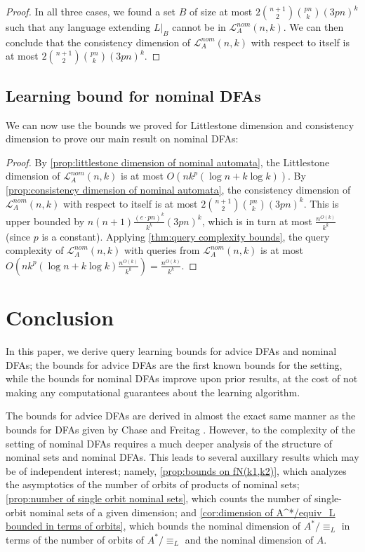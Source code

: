 \documentclass[11pt,a4paper]{amsart}
\theoremstyle{definition}
\newcommand{\mc}{\mathcal}
\begin{document}
\begin{proof}
    In all three cases, we found a set $B$ of size at most $2 \binom{n+1}{2} \binom{pn}{k} (3pn)^k$ such that any language extending $L|_B$ cannot be in $\mc L^{nom}_A(n,k)$. 
    We can then conclude that the consistency dimension of $\mc L^{nom}_A(n,k)$ with respect to itself is at most $2 \binom{n+1}{2} \binom{pn}{k} (3pn)^k$.
\end{proof}



\subsection{Learning bound for nominal DFAs}

We can now use the bounds we proved for Littlestone dimension and consistency dimension to prove our main result on nominal DFAs:


\nominalLCfixedalphabet


\begin{proof}
    By \autoref{prop:littlestone dimension of nominal automata}, the Littlestone dimension of $\mc L^{nom}_A(n,k)$ is at most $O\left(nk^{p} \left(\log n + k \log k \right)\right)$. 
    By \autoref{prop:consistency dimension of nominal automata}, the consistency dimension of $\mc L^{nom}_A(n,k)$ with respect to itself is at most $2 \binom{n+1}{2} \binom{pn}{k} (3pn)^k$.
    This is upper bounded by $n(n+1) \frac{(e \cdot pn)^k}{k^k} (3pn)^k$, which is in turn at most $\frac{n^{O(k)}}{k^k}$ (since $p$ is a constant).
    Applying \autoref{thm:query complexity bounds}, the query complexity of $\mc L^{nom}_A(n,k)$ with queries from $\mc L^{nom}_A(n,k)$ is at most $O\left(nk^{p} \left(\log n + k \log k \right) \frac{n^{O(k)}}{k^k}\right) = \frac{n^{O(k)}}{k^k}$.
\end{proof}


\section{Conclusion} \label{section:conclusion}

In this paper, we derive query learning bounds for advice DFAs and nominal DFAs; the bounds for advice DFAs are the first known bounds for the setting, while the bounds for nominal DFAs improve upon prior results, at the cost of not making any computational guarantees about the learning algorithm.

The bounds for advice DFAs are derived in almost the exact same manner as the bounds for DFAs given by Chase and Freitag \cite{chase-freitag:bounds-in-query-learning}. 
However, to the complexity of the setting of nominal DFAs requires a much deeper analysis of the structure of nominal sets and nominal DFAs.
This leads to several auxillary results which may be of independent interest; namely, \autoref{prop:bounds on fN(k1,k2)}, which analyzes the asymptotics of the number of orbits of products of nominal sets; \autoref{prop:number of single orbit nominal sets}, which counts the number of single-orbit nominal sets of a given dimension; and \autoref{cor:dimension of A^*/equiv_L bounded in terms of orbits}, which bounds the nominal dimension of $A^* / \equiv_L$ in terms of the number of orbits of $A^* / \equiv_L$ and the nominal dimension of $A$.
\end{document}
